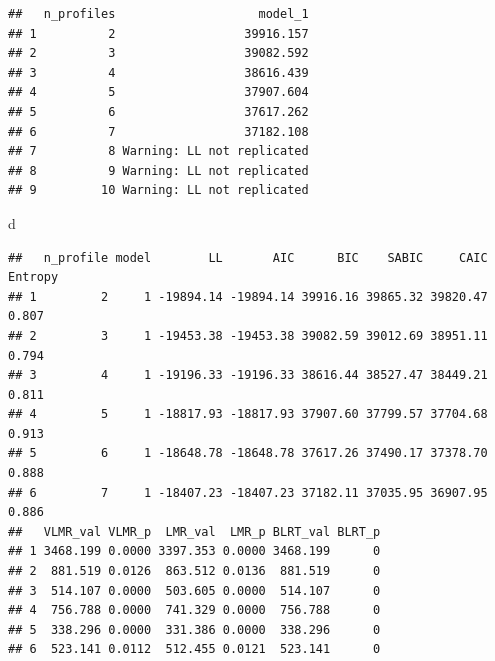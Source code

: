 \documentclass[]{msu-thesis}
\newenvironment{Shaded}{\begin{snugshade}}{\end{snugshade}}
\newcommand{\KeywordTok}[1]{\textcolor[rgb]{0.13,0.29,0.53}{\textbf{#1}}}
\newcommand{\DataTypeTok}[1]{\textcolor[rgb]{0.13,0.29,0.53}{#1}}
\newcommand{\StringTok}[1]{\textcolor[rgb]{0.31,0.60,0.02}{#1}}
\newcommand{\OperatorTok}[1]{\textcolor[rgb]{0.81,0.36,0.00}{\textbf{#1}}}
\newcommand{\NormalTok}[1]{#1}
\theoremstyle{definition}
\theoremstyle{definition}
\theoremstyle{definition}
\theoremstyle{remark}
\begin{document}
\begin{verbatim}
##   n_profiles                    model_1
## 1          2                  39916.157
## 2          3                  39082.592
## 3          4                  38616.439
## 4          5                  37907.604
## 5          6                  37617.262
## 6          7                  37182.108
## 7          8 Warning: LL not replicated
## 8          9 Warning: LL not replicated
## 9         10 Warning: LL not replicated
\end{verbatim}

\begin{Shaded}
\begin{Highlighting}[]
\NormalTok{d}
\end{Highlighting}
\end{Shaded}

\begin{verbatim}
##   n_profile model        LL       AIC      BIC    SABIC     CAIC Entropy
## 1         2     1 -19894.14 -19894.14 39916.16 39865.32 39820.47   0.807
## 2         3     1 -19453.38 -19453.38 39082.59 39012.69 38951.11   0.794
## 3         4     1 -19196.33 -19196.33 38616.44 38527.47 38449.21   0.811
## 4         5     1 -18817.93 -18817.93 37907.60 37799.57 37704.68   0.913
## 5         6     1 -18648.78 -18648.78 37617.26 37490.17 37378.70   0.888
## 6         7     1 -18407.23 -18407.23 37182.11 37035.95 36907.95   0.886
##   VLMR_val VLMR_p  LMR_val  LMR_p BLRT_val BLRT_p
## 1 3468.199 0.0000 3397.353 0.0000 3468.199      0
## 2  881.519 0.0126  863.512 0.0136  881.519      0
## 3  514.107 0.0000  503.605 0.0000  514.107      0
## 4  756.788 0.0000  741.329 0.0000  756.788      0
## 5  338.296 0.0000  331.386 0.0000  338.296      0
## 6  523.141 0.0112  512.455 0.0121  523.141      0
\end{verbatim}

\begin{Shaded}
\end{Shaded}
\end{document}
